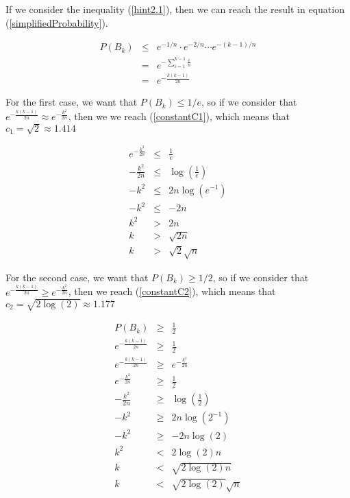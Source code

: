 \documentclass[tikz, 12pt]{scrartcl}
\begin{document}
\begin{enumerate}
	If we consider the inequality (\ref{hint2.1}), then we can reach the result in equation (\ref{simplifiedProbability}).
	
	\begin{eqnarray}
	P(B_k)	&	\leq	&	e^{-1/n} \cdot e^{-2/n} \cdots e^{-(k - 1)/n} \nonumber \\
			&	=	&	e^{-\sum_{i = 1}^{k -1} \frac{i}{n}} \nonumber \\
			&	=	&	e^{-\frac{k(k-1)}{2n}} \label{simplifiedProbability}
	\end{eqnarray}
	
	For the first case, we want that $P(B_{k}) \leq 1/e$, so if we consider that  $e^{-\frac{k(k-1)}{2n}} \approx e^{-\frac{k^2}{2n}} $, then we we reach (\ref{constantC1}), which means that $c_1 = \sqrt{2} \approx 1.414$
	
	\begin{eqnarray}
	{\displaystyle e^{-\frac{k^2}{2n}} }		&	\leq	&	\frac{1}{e} \nonumber \\
	-\frac{k^2}{2n}						&	\leq &	\log\left(\frac{1}{e}\right) \nonumber \\
	-k^2								& 	\leq & 2n \log(e^{-1}) \nonumber \\
	-k^2								&	\leq	& -2n  \nonumber \\
	k^2								& 	>	& 2  n \nonumber \\
	k								&	>	&	\sqrt{ 2 n} \nonumber \\
	k								&	>	&	\sqrt{ 2}\sqrt{n} \label{constantC1}
	\end{eqnarray}

	
	For the second case, we want that $P(B_{k}) \geq 1/2$, so if we consider that $e^{-\frac{k(k-1)}{2n}} \geq e^{-\frac{k^2}{2n}} $, then we reach (\ref{constantC2}), which means that $c_2 = \sqrt{ 2 \log(2)} \approx 1.177$
	
		
	\begin{eqnarray}
	P(B_k) 							&	\geq &	\frac{1}{2} \nonumber \\
	{\displaystyle e^{-\frac{k(k-1)}{2n}} }		&	\geq	&	\frac{1}{2} \nonumber \\
	{\displaystyle e^{-\frac{k(k-1)}{2n}} }		&	\geq	&	{\displaystyle e^{-\frac{k^2}{2n}} }	 \nonumber \\
	{\displaystyle e^{-\frac{k^2}{2n}} }		&	\geq	&	\frac{1}{2} \nonumber \\
	-\frac{k^2}{2n}						&	\geq &	\log\left(\frac{1}{2}\right) \nonumber \\
	-k^2								& 	\geq & 2n \log(2^{-1}) \nonumber \\
	-k^2								&	\geq	& -2n \log(2) \nonumber \\
	k^2								& <		& 2 \log(2) n \nonumber \\
	k								&	<	&	\sqrt{ 2 \log(2) n} \nonumber \\
	k								&	<	&	\sqrt{ 2 \log(2)}\sqrt{n} \label{constantC2}
	\end{eqnarray}


\end{enumerate}
\end{document}
